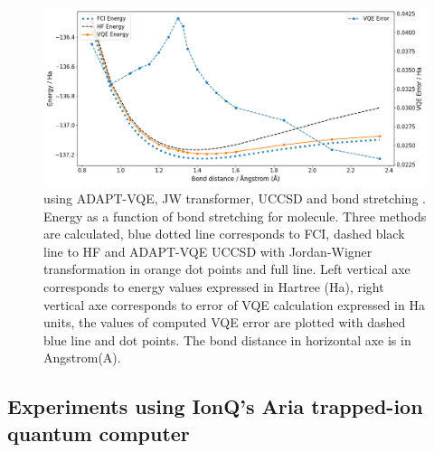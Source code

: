 \documentclass[journal,onecolumn]{IEEEtran}
\begin{document}
\begin{figure}[!htb]
\centering
\includegraphics[width=\textwidth]{bond_stretching_CH3F.png}
\caption{ using ADAPT-VQE, JW transformer, UCCSD and bond stretching . Energy as a function of bond stretching for  molecule. Three methods are calculated, blue dotted line corresponds to FCI, dashed black line to HF and ADAPT-VQE UCCSD with Jordan-Wigner transformation in orange dot points and full line. Left vertical axe corresponds to energy values expressed in Hartree (Ha), right vertical axe corresponds to error of VQE calculation expressed in Ha units, the values of computed VQE error are plotted with dashed blue line and dot points. The bond distance in horizontal axe is in Angstrom(A).}
\label{fig:ch3f_using_adapt_vqe_uccsd_and_bond_stretching}
\end{figure}

\subsection{Experiments using IonQ's Aria trapped-ion quantum computer}
\label{sec:computational_chemistry_challenges_in_pfas}
\end{document}
